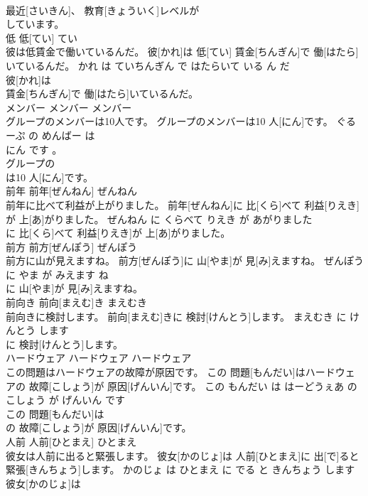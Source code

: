 \documentclass[8pt]{extreport}
\begin{document}
\begin{CJK}{UTF8}{min}
\\	最近[さいきん]、 教育[きょういく]レベルが
\\	しています。			
\\	低	低[てい]	てい	
\\	彼は低賃金で働いているんだ。	彼[かれ]は 低[てい] 賃金[ちんぎん]で 働[はたら]いているんだ。	かれ は ていちんぎん で はたらいて いる ん だ	
\\	彼[かれ]は
\\	賃金[ちんぎん]で 働[はたら]いているんだ。			
\\	メンバー	メンバー	メンバー	
\\	グループのメンバーは10人です。	グループのメンバーは10 人[にん]です。	ぐるーぷ の めんばー は 
\\	にん です 。	
\\	グループの
\\	は10 人[にん]です。			
\\	前年	前年[ぜんねん]	ぜんねん	
\\	前年に比べて利益が上がりました。	前年[ぜんねん]に 比[くら]べて 利益[りえき]が 上[あ]がりました。	ぜんねん に くらべて りえき が あがりました	
\\	に 比[くら]べて 利益[りえき]が 上[あ]がりました。			
\\	前方	前方[ぜんぽう]	ぜんぽう	
\\	前方に山が見えますね。	前方[ぜんぽう]に 山[やま]が 見[み]えますね。	ぜんぽう に やま が みえます ね	
\\	に 山[やま]が 見[み]えますね。			
\\	前向き	前向[まえむ]き	まえむき	
\\	前向きに検討します。	前向[まえむ]きに 検討[けんとう]します。	まえむき に けんとう します	
\\	に 検討[けんとう]します。			
\\	ハードウェア	ハードウェア	ハードウェア	
\\	この問題はハードウェアの故障が原因です。	この 問題[もんだい]はハードウェアの 故障[こしょう]が 原因[げんいん]です。	この もんだい は はーどうぇあ の こしょう が げんいん です	
\\	この 問題[もんだい]は
\\	の 故障[こしょう]が 原因[げんいん]です。			
\\	人前	人前[ひとまえ]	ひとまえ	
\\	彼女は人前に出ると緊張します。	彼女[かのじょ]は 人前[ひとまえ]に 出[で]ると 緊張[きんちょう]します。	かのじょ は ひとまえ に でる と きんちょう します	
\\	彼女[かのじょ]は

\end{CJK}
\end{document}
